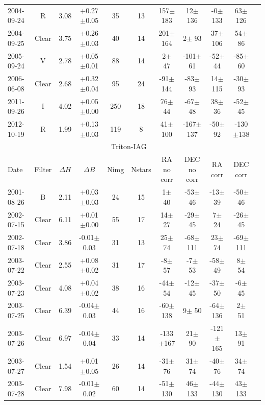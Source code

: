 \documentclass[12pt,a4paper]{report}
\begin{document}
\begin{landscape}
\begin{longtable}{|l|c|c|c|c|c|c|c|c|c|c|}
2004-09-24 & R     & 3.08 & +0.27$\pm$0.05 &  35 &  13 &  157$\pm$183 &   12$\pm$136 &   -0$\pm$133 &   63$\pm$126 \\ 
2004-09-25 & Clear & 3.75 & +0.26$\pm$0.03 &  40 &  14 &  201$\pm$164 &    2$\pm$ 93 &   37$\pm$106 &   54$\pm$ 86 \\ 
2005-09-24 & V     & 2.78 & +0.05$\pm$0.01 &  88 &  14 &    2$\pm$ 47 & -101$\pm$ 61 &  -52$\pm$ 44 &  -85$\pm$ 60 \\ 
2006-06-08 & Clear & 2.68 & +0.32$\pm$0.04 &  95 &  24 &  -91$\pm$144 &  -83$\pm$ 93 &   14$\pm$115 &  -30$\pm$ 93 \\ 
2011-09-26 & I     & 4.02 & +0.05$\pm$0.00 & 250 &  18 &   76$\pm$ 44 &  -67$\pm$ 48 &   38$\pm$ 36 &  -52$\pm$ 45 \\ 
2012-10-19 & R     & 1.99 & +0.13$\pm$0.03 & 119 &   8 &   41$\pm$100 & -167$\pm$137 &  -50$\pm$ 92 & -130$\pm$138 \\ 
\hline
\multicolumn{10}{|c|}{Triton-IAG}\\
Date & Filter & $\Delta H$ & $\Delta B$ & Nimg & Nstars & RA no corr & DEC no corr & RA corr & DEC corr \\
\hline
2001-08-26 & B     & 2.11 & +0.03$\pm$0.03 &  24 &  15 &    1$\pm$ 40 &  -53$\pm$ 46 &  -13$\pm$ 39 &  -50$\pm$ 46 \\ 
2002-07-15 & Clear & 6.11 & +0.01$\pm$0.00 &  55 &  17 &   14$\pm$ 27 &  -29$\pm$ 45 &    7$\pm$ 24 &  -26$\pm$ 45 \\ 
2002-07-18 & Clear & 3.86 & -0.01$\pm$0.03 &  31 &  13 &   25$\pm$ 74 &  -68$\pm$111 &   23$\pm$ 74 &  -69$\pm$111 \\ 
2003-07-22 & Clear & 2.55 & +0.08$\pm$0.02 &  31 &  17 &   -8$\pm$ 57 &   -7$\pm$ 53 &  -58$\pm$ 49 &    8$\pm$ 54 \\ 
2003-07-23 & Clear & 4.08 & +0.04$\pm$0.02 &  38 &  16 &  -44$\pm$ 54 &  -12$\pm$ 45 &  -37$\pm$ 50 &   -6$\pm$ 45 \\ 
2003-07-25 & Clear & 6.39 & -0.04$\pm$0.03 &  44 &  16 &  -60$\pm$138 &    9$\pm$ 50 &  -64$\pm$136 &    2$\pm$ 51 \\ 
2003-07-26 & Clear & 6.97 & -0.04$\pm$0.04 &  33 &  14 & -133$\pm$167 &   21$\pm$ 90 & -121$\pm$165 &   13$\pm$ 91 \\ 
2003-07-27 & Clear & 1.54 & +0.01$\pm$0.05 &  26 &  14 &  -31$\pm$ 76 &   31$\pm$ 74 &  -40$\pm$ 76 &   34$\pm$ 74 \\ 
2003-07-28 & Clear & 7.98 & -0.01$\pm$0.02 &  60 &  14 &  -51$\pm$130 &   46$\pm$133 &  -44$\pm$130 &   43$\pm$133 \\ 

\end{longtable}
\end{landscape}
\end{document}
